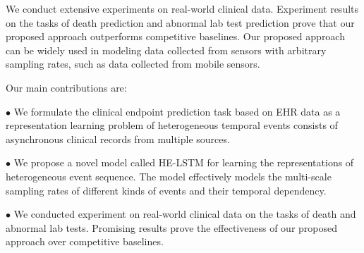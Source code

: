\documentclass[letterpaper]{article} %
\begin{document}




We conduct extensive experiments on real-world clinical data. Experiment results on the tasks of death prediction and abnormal lab test prediction prove that our proposed approach outperforms competitive baselines. Our proposed approach can be widely used in modeling data collected from sensors with arbitrary sampling rates, such as data collected from mobile sensors. 

Our main contributions are:

$\bullet$ We formulate the clinical endpoint prediction task based on EHR data as a representation learning problem of heterogeneous temporal events consists of  asynchronous clinical records from multiple sources.

$\bullet$  We propose a novel model called HE-LSTM for learning the representations of heterogeneous event sequence. The model effectively models the multi-scale sampling rates of different kinds of events and their temporal dependency.


$\bullet$ We conducted experiment on real-world clinical data on the tasks of death and abnormal lab tests. Promising results prove the effectiveness of our proposed approach over competitive baselines. 
\end{document}
